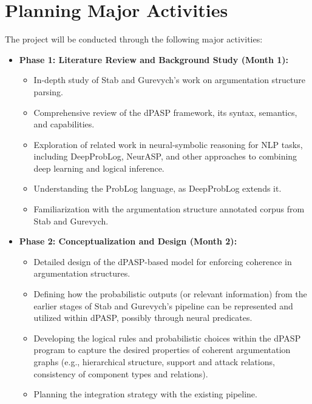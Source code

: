 \documentclass{article}
\begin{document}
\section{Planning Major Activities}

The project will be conducted through the following major activities:

\begin{itemize}
    \item \textbf{Phase 1: Literature Review and Background Study (Month 1):}
    \begin{itemize}
        \item In-depth study of Stab and Gurevych's work on argumentation
        structure parsing.
        \item Comprehensive review of the dPASP framework, its syntax,
        semantics, and capabilities.
        \item Exploration of related work in neural-symbolic reasoning for NLP
        tasks, including DeepProbLog, NeurASP, and other approaches to combining
         deep learning and logical inference.
        \item Understanding the ProbLog language, as DeepProbLog extends it.
        \item Familiarization with the argumentation structure annotated corpus
        from Stab and Gurevych.
    \end{itemize}
    
    \item \textbf{Phase 2: Conceptualization and Design (Month 2):}
    \begin{itemize}
        \item Detailed design of the dPASP-based model for enforcing coherence
        in argumentation structures.
        \item Defining how the probabilistic outputs (or relevant information)
        from the earlier stages of Stab and Gurevych's pipeline can be
        represented and utilized within dPASP, possibly through neural
        predicates.
        \item Developing the logical rules and probabilistic choices within the
        dPASP program to capture the desired properties of coherent
        argumentation graphs (e.g., hierarchical structure, support and attack
        relations, consistency of component types and relations).
        \item Planning the integration strategy with the existing pipeline.
    \end{itemize}
    

\end{itemize}
\end{document}

